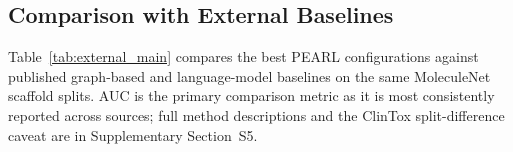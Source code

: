 \documentclass[9pt,twocolumn,conference]{IEEEtran}
\begin{document}
\begin{table}[!ht]
\centering
\caption{Selected LoRA configurations illustrating the range of parameter efficiency. Trainable~\% = 100 $\times$ trainable / total parameters.}
\label{tab:params}
\end{table}

\subsection{Comparison with External Baselines}\label{sec:external_comparison}
Table~\ref{tab:external_main} compares the best PEARL configurations against published
graph-based and language-model baselines on the same MoleculeNet scaffold splits.
AUC is the primary comparison metric as it is most consistently reported across sources;
full method descriptions and the ClinTox split-difference caveat are in Supplementary Section~S5.
\end{document}
